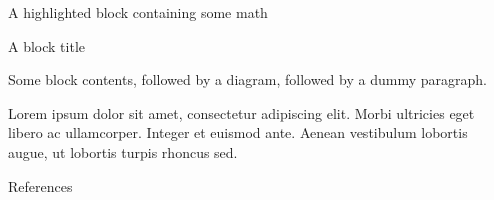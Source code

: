 \documentclass[final]{beamer}
\newlength{\sepwidth}
\newlength{\colwidth}
\newcommand{\separatorcolumn}{\begin{column}{\sepwidth}\end{column}}
\begin{document}
\begin{frame}[t]
\begin{columns}[t]
\begin{column}{\colwidth}
\begin{exampleblock}{A highlighted block containing some math}
  \end{exampleblock}

  \begin{block}{A block title}

    Some block contents, followed by a diagram, followed by a dummy paragraph.

    Lorem ipsum dolor sit amet, consectetur adipiscing elit. Morbi ultricies
    eget libero ac ullamcorper. Integer et euismod ante. Aenean vestibulum
    lobortis augue, ut lobortis turpis rhoncus sed. 
  \end{block}

  \begin{block}{References}
   \nocite{*}
   \footnotesize{}

  \end{block}

\end{column}

\separatorcolumn
\end{columns}
\end{frame}
\end{document}
